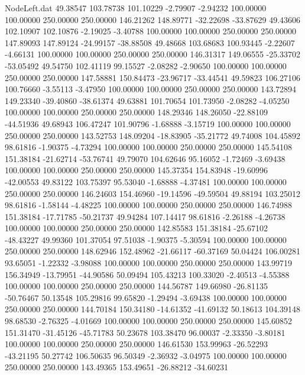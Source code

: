 \begin{filecontents}{NodeLeft.dat}
  49.38547  103.78738  101.10229    -2.79907   -2.94232  100.00000  100.00000  250.00000  250.00000  146.21262  148.89771  -32.22698  -33.87629
  49.43606  102.10907  102.10876    -2.19025   -3.40788  100.00000  100.00000  250.00000  250.00000  147.89093  147.89124  -24.99157  -38.88508
  49.48668  103.68683  100.93445    -2.22607   -4.66131  100.00000  100.00000  250.00000  250.00000  146.31317  149.06555  -25.33702  -53.05492
  49.54750  102.41119   99.15527    -2.08282   -2.90650  100.00000  100.00000  250.00000  250.00000  147.58881  150.84473  -23.96717  -33.44541
  49.59823  106.27106  100.76660    -3.55113   -3.47950  100.00000  100.00000  250.00000  250.00000  143.72894  149.23340  -39.40860  -38.61374
  49.63881  101.70654  101.73950    -2.08282   -4.05250  100.00000  100.00000  250.00000  250.00000  148.29346  148.26050  -22.88109  -44.51936
  49.68943  106.47247  101.90796    -1.68888   -3.15719  100.00000  100.00000  250.00000  250.00000  143.52753  148.09204  -18.83905  -35.21772
  49.74008  104.45892   98.61816    -1.90375   -4.73294  100.00000  100.00000  250.00000  250.00000  145.54108  151.38184  -21.62714  -53.76741
  49.79070  104.62646   95.16052    -1.72469   -3.69438  100.00000  100.00000  250.00000  250.00000  145.37354  154.83948  -19.60996  -42.00553
  49.83122  103.75397   95.53040    -1.68888   -4.37481  100.00000  100.00000  250.00000  250.00000  146.24603  154.46960  -19.14596  -49.59504
  49.88194  103.25012   98.61816    -1.58144   -4.48225  100.00000  100.00000  250.00000  250.00000  146.74988  151.38184  -17.71785  -50.21737
  49.94284  107.14417   98.61816    -2.26188   -4.26738  100.00000  100.00000  250.00000  250.00000  142.85583  151.38184  -25.67102  -48.43227
  49.99360  101.37054   97.51038    -1.90375   -5.30594  100.00000  100.00000  250.00000  250.00000  148.62946  152.48962  -21.66117  -60.37169
  50.04424  106.00281   93.65051    -1.22332   -3.98088  100.00000  100.00000  250.00000  250.00000  143.99719  156.34949  -13.79951  -44.90586
  50.09494  105.43213  100.33020    -2.40513   -4.55388  100.00000  100.00000  250.00000  250.00000  144.56787  149.66980  -26.81135  -50.76467
  50.13548  105.29816   99.65820    -1.29494   -3.69438  100.00000  100.00000  250.00000  250.00000  144.70184  150.34180  -14.61352  -41.69132
  50.18613  104.39148   98.68530    -2.76325   -4.01669  100.00000  100.00000  250.00000  250.00000  145.60852  151.31470  -31.45126  -45.71783
  50.23678  103.38470   96.00037    -2.33350   -3.80181  100.00000  100.00000  250.00000  250.00000  146.61530  153.99963  -26.52293  -43.21195
  50.27742  106.50635   96.50349    -2.36932   -3.04975  100.00000  100.00000  250.00000  250.00000  143.49365  153.49651  -26.88212  -34.60231

\end{filecontents}
